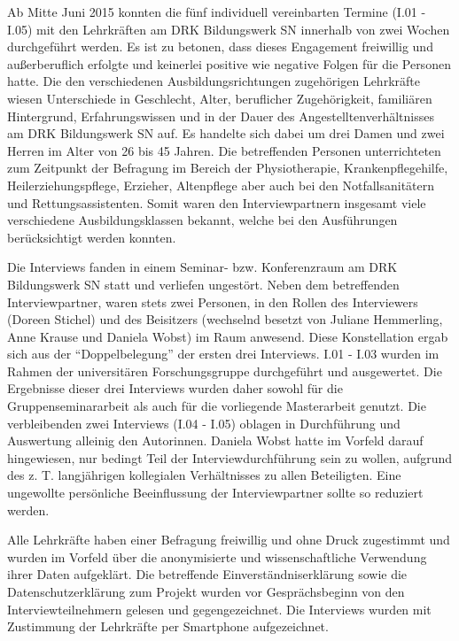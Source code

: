 Ab Mitte Juni 2015 konnten die fünf individuell vereinbarten Termine (I.01 - I.05) mit den Lehrkräften am DRK Bildungswerk SN innerhalb von zwei Wochen durchgeführt werden. Es ist zu betonen, dass dieses Engagement freiwillig und außerberuflich erfolgte und keinerlei positive wie negative Folgen für die Personen hatte. Die den verschiedenen Ausbildungsrichtungen zugehörigen Lehrkräfte wiesen Unterschiede in Geschlecht, Alter, beruflicher Zugehörigkeit, familiären Hintergrund, Erfahrungswissen und in der Dauer des Angestelltenverhältnisses am DRK Bildungswerk SN auf. Es handelte sich dabei um drei Damen und zwei Herren im Alter von 26 bis 45 Jahren. Die betreffenden Personen unterrichteten zum Zeitpunkt der Befragung im Bereich der Physiotherapie, Krankenpflegehilfe, Heilerziehungspflege, Erzieher, Altenpflege aber auch bei den Notfallsanitätern und Rettungsassistenten. Somit waren den Interviewpartnern insgesamt viele verschiedene Ausbildungsklassen bekannt, welche bei den Ausführungen berücksichtigt werden konnten.

Die Interviews fanden in einem Seminar- bzw. Konferenzraum am DRK Bildungswerk SN statt und verliefen ungestört.
Neben dem betreffenden Interviewpartner, waren stets zwei Personen, in den Rollen des Interviewers (Doreen Stichel) und des Beisitzers (wechselnd besetzt von Juliane Hemmerling, Anne Krause und Daniela Wobst) im Raum anwesend. Diese Konstellation ergab sich aus der "`Doppelbelegung"' der ersten drei Interviews. I.01 - I.03 wurden im Rahmen der universitären Forschungsgruppe durchgeführt und ausgewertet. Die Ergebnisse dieser drei Interviews wurden daher sowohl für die Gruppenseminararbeit als auch für die vorliegende Masterarbeit genutzt. Die verbleibenden zwei Interviews (I.04 - I.05) oblagen in Durchführung und Auswertung alleinig den Autorinnen. Daniela Wobst hatte im Vorfeld darauf hingewiesen, nur bedingt Teil der Interviewdurchführung sein zu wollen, aufgrund des z. T. langjährigen kollegialen Verhältnisses zu allen Beteiligten. Eine ungewollte persönliche Beeinflussung der Interviewpartner sollte so reduziert werden.

Alle Lehrkräfte haben einer Befragung freiwillig und ohne Druck zugestimmt und wurden im Vorfeld über die anonymisierte und wissenschaftliche Verwendung ihrer Daten aufgeklärt. Die betreffende Einverständniserklärung sowie die Datenschutzerklärung zum Projekt wurden vor Gesprächsbeginn von den Interviewteilnehmern gelesen und gegengezeichnet. Die Interviews wurden mit Zustimmung der Lehrkräfte per Smartphone aufgezeichnet. 

